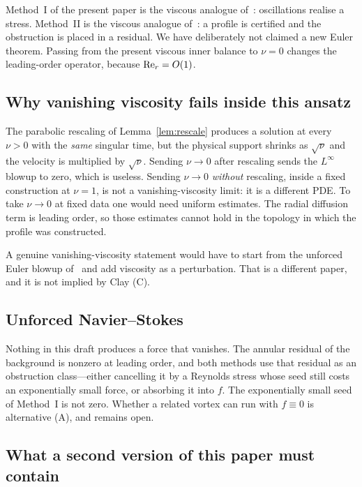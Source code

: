 Method~I of the present paper is the viscous analogue of~\cite{alpoegbuckmaster2026,openai2026ns}: oscillations realise a stress. Method~II is the viscous analogue of~\cite{chenhou2022,anandkumar2026}: a profile is certified and the obstruction is placed in a residual. We have deliberately not claimed a new {E}uler theorem. Passing from the present viscous inner balance to $\nu=0$ changes the leading-order operator, because $\mathrm{Re}_r=O(1)$.

\subsection{Why vanishing viscosity fails inside this ansatz}

The parabolic rescaling of Lemma~\ref{lem:rescale} produces a solution at every $\nu>0$ with the \emph{same} singular time, but the physical support shrinks as $\sqrt{\nu}$ and the velocity is multiplied by $\sqrt{\nu}$. Sending $\nu\to 0$ after rescaling sends the $L^\infty$ blowup to zero, which is useless. Sending $\nu\to 0$ \emph{without} rescaling, inside a fixed construction at $\nu=1$, is not a vanishing-viscosity limit: it is a different PDE. To take $\nu\to 0$ at fixed data one would need uniform estimates. The radial diffusion term is leading order, so those estimates cannot hold in the topology in which the profile was constructed.

A genuine vanishing-viscosity statement would have to start from the unforced {E}uler blowup of~\cite{openai2026euler} and add viscosity as a perturbation. That is a different paper, and it is not implied by {C}lay (C).

\subsection{Unforced {N}avier--{S}tokes}

Nothing in this draft produces a force that vanishes. The annular residual of the background is nonzero at leading order, and both methods use that residual as an obstruction class---either cancelling it by a {R}eynolds stress whose seed still costs an exponentially small force, or absorbing it into $f$. The exponentially small seed of Method~I is not zero. Whether a related vortex can run with $f\equiv 0$ is alternative (A), and remains open.

\subsection{What a second version of this paper must contain}

